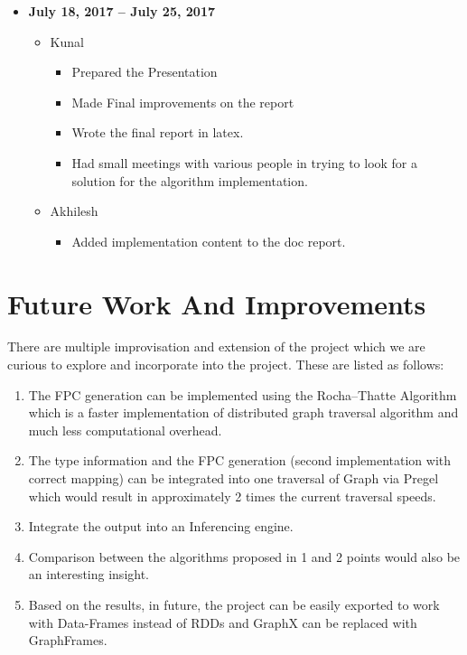 \documentclass{easychair}
\begin{document}
\begin{itemize}
\begin{itemize}
    \end{itemize}
   \item \textbf{July 18, 2017 – July 25, 2017}
    \begin{itemize}
    \item Kunal
    \begin{itemize}
    \item Prepared the Presentation
\item  Made Final improvements on the report
\item  Wrote the final report in latex.
\item  Had small meetings with various people in trying to look for a solution for the algorithm implementation.

 \end{itemize}
 \item Akhilesh
  \begin{itemize}
   \item Added implementation content to the doc report.
 \end{itemize}
     \end{itemize}
\end{itemize}


\section{Future Work And Improvements}
There are multiple improvisation and extension of the project which we are curious to explore and incorporate into the project. These  are listed as follows:

\begin{enumerate}
\item The FPC generation can be implemented using the Rocha–Thatte Algorithm which is a faster implementation of distributed graph traversal algorithm and much less computational overhead.
\item The type information and the FPC generation (second implementation with correct mapping) can be integrated into one traversal of Graph via Pregel which would result in approximately 2 times the current traversal speeds.
\item Integrate the output into an Inferencing engine.
\item Comparison between the algorithms proposed in 1 and 2 points would also be an interesting insight.
\item Based on the results, in future, the project can be easily exported to work with Data-Frames instead of RDDs and GraphX can be replaced with GraphFrames\cite{graphframes}.

\end{enumerate}
\end{document}
